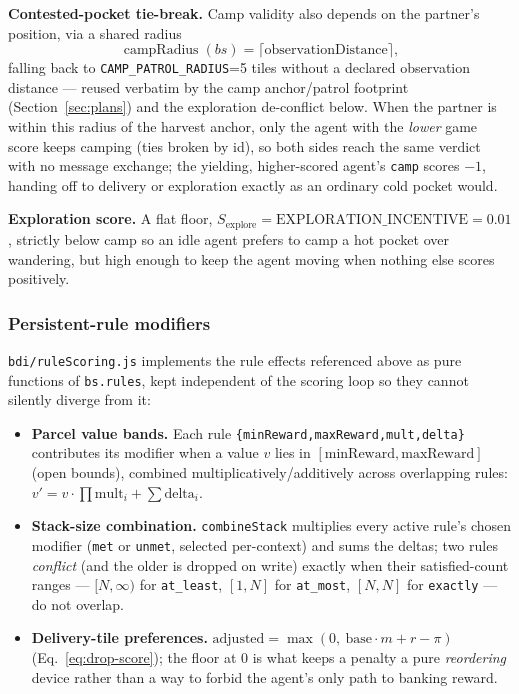\documentclass[11pt,a4paper]{article}
\renewcommand{\paragraph}[1]{\par\smallskip\noindent\textbf{#1}}
\begin{document}
\paragraph{Contested-pocket tie-break.} Camp validity also depends on the partner's position, via
a shared radius
\begin{equation}
\operatorname{campRadius}(bs) = \lceil \text{observationDistance} \rceil,
\end{equation}
falling back to \texttt{CAMP\_PATROL\_RADIUS}=5 tiles without a declared observation distance ---
reused verbatim by the camp anchor/patrol footprint (Section~\ref{sec:plans}) and the exploration
de-conflict below. When the partner is within this radius of the harvest anchor, only the agent
with the \emph{lower} game score keeps camping (ties broken by id), so both sides reach the same
verdict with no message exchange; the yielding, higher-scored agent's \texttt{camp} scores $-1$,
handing off to delivery or exploration exactly as an ordinary cold pocket would.

\paragraph{Exploration score.} A flat floor, $S_{\text{explore}} = \text{EXPLORATION\_INCENTIVE} = 0.01$,
strictly below camp so an idle agent prefers to camp a hot pocket over wandering, but high
enough to keep the agent moving when nothing else scores positively.

\subsubsection{Persistent-rule modifiers}
\label{sec:rulescoring}

\texttt{bdi/ruleScoring.js} implements the rule effects referenced above as pure functions of
\texttt{bs.rules}, kept independent of the scoring loop so they cannot silently diverge from it:

\begin{itemize}
  \item \textbf{Parcel value bands.} Each rule \texttt{\{minReward,maxReward,mult,delta\}}
  contributes its modifier when a value $v$ lies in $[\text{minReward},\text{maxReward}]$
  (open bounds), combined multiplicatively/additively across overlapping rules:
  $v' = v\cdot\!\prod\text{mult}_i + \sum\text{delta}_i$.
  \item \textbf{Stack-size combination.} \texttt{combineStack} multiplies every active rule's
  chosen modifier (\texttt{met} or \texttt{unmet}, selected per-context) and sums the deltas;
  two rules \emph{conflict} (and the older is dropped on write) exactly when their
  satisfied-count ranges --- $[N,\infty)$ for \texttt{at\_least}, $[1,N]$ for \texttt{at\_most},
  $[N,N]$ for \texttt{exactly} --- do not overlap.
  \item \textbf{Delivery-tile preferences.} $\text{adjusted} = \max(0,\ \text{base}\cdot m + r - \pi)$
  (Eq.~\ref{eq:drop-score}); the floor at 0 is what keeps a penalty a pure \emph{reordering}
  device rather than a way to forbid the agent's only path to banking reward.
\end{itemize}
\end{document}
